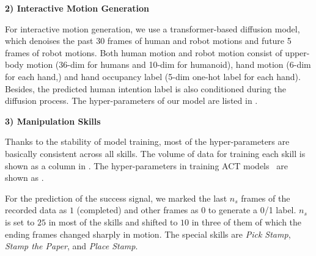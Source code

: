 

\noindent\textbf{2) Interactive Motion Generation}

% 
For interactive motion generation, we use a transformer-based diffusion model, which denoises the past 30 frames of human and robot motions and future 5 frames of robot motions. Both human motion and robot motion consist of upper-body motion (36-dim for humans and 10-dim for humanoid), hand motion (6-dim for each hand,) and hand occupancy label (5-dim one-hot label for each hand). Besides, the predicted human intention label is also conditioned during the diffusion process. The hyper-parameters of our model are listed in .


\noindent\textbf{3) Manipulation Skills}

Thanks to the stability of model training, most of the hyper-parameters are basically consistent across all skills.
The volume of data for training each skill is shown as a column in .
The hyper-parameters in training ACT models~\cite{zhao2023learning} are shown as .



For the prediction of the success signal, we marked the last $n_{s}$ frames of the recorded data as $1$ (completed) and other frames as $0$ to generate a 0/1 label.
$n_{s}$ is set to $25$ in most of the skills and shifted to $10$ in three of them of which the ending frames changed sharply in motion.
The special skills are \textit{Pick Stamp}, \textit{Stamp the Paper}, and \textit{Place Stamp}.

% 

